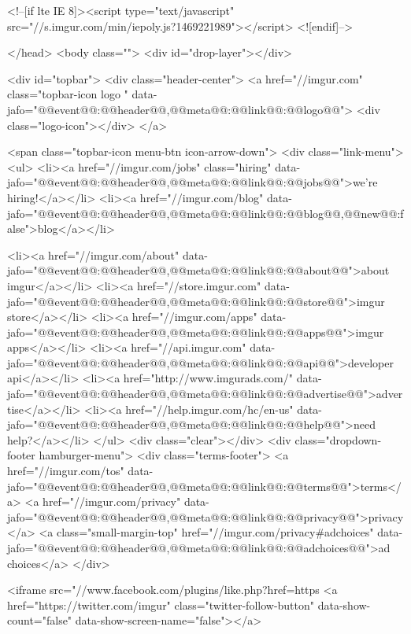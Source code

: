     <!--[if lte IE 8]><script type="text/javascript" src="//s.imgur.com/min/iepoly.js?1469221989"></script>
<![endif]-->
    
</head>
<body class="">
    <div id="drop-layer"></div>
                        

<div id="topbar">
    <div class="header-center">
        <a href="//imgur.com" class="topbar-icon logo " data-jafo="{@@event@@:@@header@@,@@meta@@:{@@link@@:@@logo@@}}">
            <div class="logo-icon"></div>
        </a>

        <span class="topbar-icon menu-btn icon-arrow-down">
            <div class="link-menu">
                <ul>
                    <li><a href="//imgur.com/jobs" class="hiring" data-jafo="{@@event@@:@@header@@,@@meta@@:{@@link@@:@@jobs@@}}">we're hiring!</a></li>
                                        <li><a href="//imgur.com/blog" data-jafo="{@@event@@:@@header@@,@@meta@@:{@@link@@:@@blog@@,@@new@@:false}}">blog</a></li>
                    
                    <li><a href="//imgur.com/about"  data-jafo="{@@event@@:@@header@@,@@meta@@:{@@link@@:@@about@@}}">about imgur</a></li>
                    <li><a href="//store.imgur.com" data-jafo="{@@event@@:@@header@@,@@meta@@:{@@link@@:@@store@@}}">imgur store</a></li>
                    <li><a href="//imgur.com/apps"  data-jafo="{@@event@@:@@header@@,@@meta@@:{@@link@@:@@apps@@}}">imgur apps</a></li>
                    <li><a href="//api.imgur.com" data-jafo="{@@event@@:@@header@@,@@meta@@:{@@link@@:@@api@@}}">developer api</a></li>
                    <li><a href="http://www.imgurads.com/" data-jafo="{@@event@@:@@header@@,@@meta@@:{@@link@@:@@advertise@@}}">advertise</a></li>
                    <li><a href="//help.imgur.com/hc/en-us" data-jafo="{@@event@@:@@header@@,@@meta@@:{@@link@@:@@help@@}}">need help?</a></li>
                </ul>
                <div class="clear"></div>
                <div class="dropdown-footer hamburger-menu">
                    <div class="terms-footer">
                        <a href="//imgur.com/tos"  data-jafo="{@@event@@:@@header@@,@@meta@@:{@@link@@:@@terms@@}}">terms</a>
                        <a href="//imgur.com/privacy"  data-jafo="{@@event@@:@@header@@,@@meta@@:{@@link@@:@@privacy@@}}">privacy</a>
                        <a class="small-margin-top" href="//imgur.com/privacy#adchoices" data-jafo="{@@event@@:@@header@@,@@meta@@:{@@link@@:@@adchoices@@}}">ad choices</a>
                    </div>
                     
                    <iframe src="//www.facebook.com/plugins/like.php?href=https%
                    <a href="https://twitter.com/imgur" class="twitter-follow-button" data-show-count="false" data-show-screen-name="false"></a>
                    
